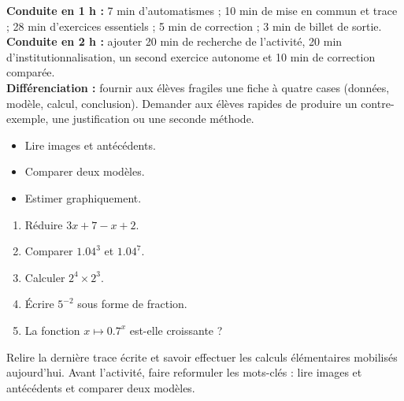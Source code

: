 \ifmxteacher
\begin{method}
\textbf{Conduite en 1 h :} 7 min d'automatismes ; 10 min de mise en commun et trace ; 28 min d'exercices essentiels ; 5 min de correction ; 3 min de billet de sortie.\\
\textbf{Conduite en 2 h :} ajouter 20 min de recherche de l'activité, 20 min d'institutionnalisation, un second exercice autonome et 10 min de correction comparée.\\
\textbf{Différenciation :} fournir aux élèves fragiles une fiche à quatre cases (données, modèle, calcul, conclusion). Demander aux élèves rapides de produire un contre-exemple, une justification ou une seconde méthode.
\end{method}
\fi
{}
\begin{objectives}\begin{itemize}\item Lire images et antécédents.\item Comparer deux modèles.\item Estimer graphiquement.\end{itemize}\end{objectives}
\begin{fluency}\begin{enumerate}\item Réduire $3x+7-x+2$. \item Comparer $\num{1,04}^3$ et $\num{1,04}^7$. \item Calculer $2^4\times2^3$. \item Écrire $5^{-2}$ sous forme de fraction. \item La fonction $x\mapsto\num{0,7}^x$ est-elle croissante ? \end{enumerate}\end{fluency}
\begin{prerequisites}Relire la dernière trace écrite et savoir effectuer les calculs élémentaires mobilisés aujourd'hui. Avant l'activité, faire reformuler les mots-clés : lire images et antécédents et comparer deux modèles.\end{prerequisites}

